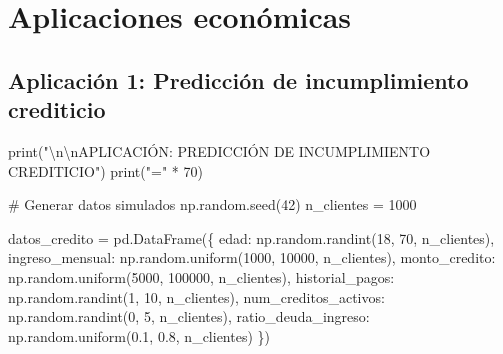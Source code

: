 \documentclass[
  doc,
  floatsintext,
  longtable,
  a4paper,
  nolmodern,
  notxfonts,
  notimes,
  12pt,
  colorlinks=true,linkcolor=blue,citecolor=blue,urlcolor=blue]{apa7}
\newenvironment{Shaded}{\begin{snugshade}}{\end{snugshade}}
\newcommand{\BuiltInTok}[1]{\textcolor[rgb]{0.00,0.23,0.31}{#1}}
\newcommand{\CharTok}[1]{\textcolor[rgb]{0.13,0.47,0.30}{#1}}
\newcommand{\CommentTok}[1]{\textcolor[rgb]{0.37,0.37,0.37}{#1}}
\newcommand{\DecValTok}[1]{\textcolor[rgb]{0.68,0.00,0.00}{#1}}
\newcommand{\FloatTok}[1]{\textcolor[rgb]{0.68,0.00,0.00}{#1}}
\newcommand{\NormalTok}[1]{\textcolor[rgb]{0.00,0.23,0.31}{#1}}
\newcommand{\OperatorTok}[1]{\textcolor[rgb]{0.37,0.37,0.37}{#1}}
\newcommand{\StringTok}[1]{\textcolor[rgb]{0.13,0.47,0.30}{#1}}
\begin{document}
\section{Aplicaciones económicas}\label{aplicaciones-econuxf3micas}

\subsection{Aplicación 1: Predicción de incumplimiento
crediticio}\label{aplicaciuxf3n-1-predicciuxf3n-de-incumplimiento-crediticio}

\begin{Shaded}
\begin{Highlighting}[]
\BuiltInTok{print}\NormalTok{(}\StringTok{"}\CharTok{\textbackslash{}n\textbackslash{}n}\StringTok{APLICACIÓN: PREDICCIÓN DE INCUMPLIMIENTO CREDITICIO"}\NormalTok{)}
\BuiltInTok{print}\NormalTok{(}\StringTok{"="} \OperatorTok{*} \DecValTok{70}\NormalTok{)}

\CommentTok{\# Generar datos simulados}
\NormalTok{np.random.seed(}\DecValTok{42}\NormalTok{)}
\NormalTok{n\_clientes }\OperatorTok{=} \DecValTok{1000}

\NormalTok{datos\_credito }\OperatorTok{=}\NormalTok{ pd.DataFrame(\{}
    \StringTok{\textquotesingle{}edad\textquotesingle{}}\NormalTok{: np.random.randint(}\DecValTok{18}\NormalTok{, }\DecValTok{70}\NormalTok{, n\_clientes),}
    \StringTok{\textquotesingle{}ingreso\_mensual\textquotesingle{}}\NormalTok{: np.random.uniform(}\DecValTok{1000}\NormalTok{, }\DecValTok{10000}\NormalTok{, n\_clientes),}
    \StringTok{\textquotesingle{}monto\_credito\textquotesingle{}}\NormalTok{: np.random.uniform(}\DecValTok{5000}\NormalTok{, }\DecValTok{100000}\NormalTok{, n\_clientes),}
    \StringTok{\textquotesingle{}historial\_pagos\textquotesingle{}}\NormalTok{: np.random.randint(}\DecValTok{1}\NormalTok{, }\DecValTok{10}\NormalTok{, n\_clientes),}
    \StringTok{\textquotesingle{}num\_creditos\_activos\textquotesingle{}}\NormalTok{: np.random.randint(}\DecValTok{0}\NormalTok{, }\DecValTok{5}\NormalTok{, n\_clientes),}
    \StringTok{\textquotesingle{}ratio\_deuda\_ingreso\textquotesingle{}}\NormalTok{: np.random.uniform(}\FloatTok{0.1}\NormalTok{, }\FloatTok{0.8}\NormalTok{, n\_clientes)}
\NormalTok{\})}


\end{Highlighting}
\end{Shaded}
\end{document}
